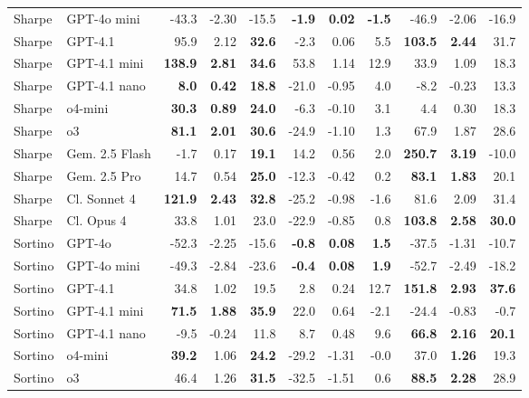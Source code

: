 \begin{table}[H]
{\begin{tabular}{ll rrr rrr rrr}
Sharpe & GPT-4o mini & -43.3 & -2.30 & -15.5 & \textbf{-1.9} & \textbf{0.02} & \textbf{-1.5} & -46.9 & -2.06 & -16.9 \\
Sharpe & GPT-4.1 & 95.9 & 2.12 & \textbf{32.6} & -2.3 & 0.06 & 5.5 & \textbf{103.5} & \textbf{2.44} & 31.7 \\
Sharpe & GPT-4.1 mini & \textbf{138.9} & \textbf{2.81} & \textbf{34.6} & 53.8 & 1.14 & 12.9 & 33.9 & 1.09 & 18.3 \\
Sharpe & GPT-4.1 nano & \textbf{8.0} & \textbf{0.42} & \textbf{18.8} & -21.0 & -0.95 & 4.0 & -8.2 & -0.23 & 13.3 \\
Sharpe & o4-mini & \textbf{30.3} & \textbf{0.89} & \textbf{24.0} & -6.3 & -0.10 & 3.1 & 4.4 & 0.30 & 18.3 \\
Sharpe & o3 & \textbf{81.1} & \textbf{2.01} & \textbf{30.6} & -24.9 & -1.10 & 1.3 & 67.9 & 1.87 & 28.6 \\
Sharpe & Gem. 2.5 Flash & -1.7 & 0.17 & \textbf{19.1} & 14.2 & 0.56 & 2.0 & \textbf{250.7} & \textbf{3.19} & -10.0 \\
Sharpe & Gem. 2.5 Pro & 14.7 & 0.54 & \textbf{25.0} & -12.3 & -0.42 & 0.2 & \textbf{83.1} & \textbf{1.83} & 20.1 \\
Sharpe & Cl. Sonnet 4 & \textbf{121.9} & \textbf{2.43} & \textbf{32.8} & -25.2 & -0.98 & -1.6 & 81.6 & 2.09 & 31.4 \\
Sharpe & Cl. Opus 4 & 33.8 & 1.01 & 23.0 & -22.9 & -0.85 & 0.8 & \textbf{103.8} & \textbf{2.58} & \textbf{30.0} \\
\midrule
Sortino & GPT-4o & -52.3 & -2.25 & -15.6 & \textbf{-0.8} & \textbf{0.08} & \textbf{1.5} & -37.5 & -1.31 & -10.7 \\
Sortino & GPT-4o mini & -49.3 & -2.84 & -23.6 & \textbf{-0.4} & \textbf{0.08} & \textbf{1.9} & -52.7 & -2.49 & -18.2 \\
Sortino & GPT-4.1 & 34.8 & 1.02 & 19.5 & 2.8 & 0.24 & 12.7 & \textbf{151.8} & \textbf{2.93} & \textbf{37.6} \\
Sortino & GPT-4.1 mini & \textbf{71.5} & \textbf{1.88} & \textbf{35.9} & 22.0 & 0.64 & -2.1 & -24.4 & -0.83 & -0.7 \\
Sortino & GPT-4.1 nano & -9.5 & -0.24 & 11.8 & 8.7 & 0.48 & 9.6 & \textbf{66.8} & \textbf{2.16} & \textbf{20.1} \\
Sortino & o4-mini & \textbf{39.2} & 1.06 & \textbf{24.2} & -29.2 & -1.31 & -0.0 & 37.0 & \textbf{1.26} & 19.3 \\
Sortino & o3 & 46.4 & 1.26 & \textbf{31.5} & -32.5 & -1.51 & 0.6 & \textbf{88.5} & \textbf{2.28} & 28.9 \\

\end{tabular}}
\end{table}
